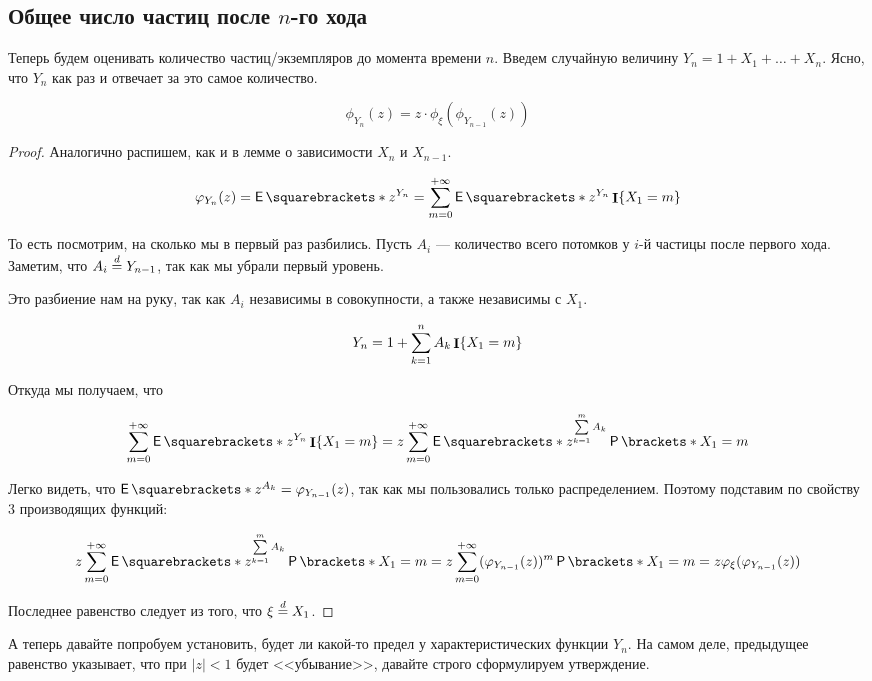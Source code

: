 \subsection{Общее число частиц после $n$-го хода}

Теперь будем оценивать количество частиц/экземпляров до момента времени $n$.
Введем случайную величину $Y_n = 1 + X_1 + \ldots + X_n$. Ясно, что $Y_n$
как раз и отвечает за это самое количество.

\begin{lemma}[О зависимости $Y_n$ и $Y_{n - 1}$]
  \[
    \phi_{Y_n}(z) = z\cdot\phi_{\xi}(\phi_{Y_{n - 1}}(z))
  \]
\end{lemma}

\begin{proof}
  Аналогично распишем, как и в лемме о зависимости $X_n$ и $X_{n - 1}$.

  \[
    \phi_{Y_n}(z) = \E{z^{Y_n}} = \sum\limits_{m = 0}^{+\infty} \E{z^{Y_n}
    \I\{X_1 = m\}}
  \]

  То есть посмотрим, на сколько мы в первый раз разбились. Пусть $A_i$ --- 
  количество всего потомков у $i$-й частицы после первого
  хода. Заметим, что $A_i \overset{d}{=} Y_{n - 1}$, так как мы убрали первый уровень.

  Это разбиение нам на руку, так как $A_i$ независимы в совокупности, а также
  независимы с $X_1$.

  \[
    Y_n = 1 + \sum\limits_{k = 1}^n A_k\mathop{\mathbf{I}}\{X_1 = m\}
  \]

  Откуда мы получаем, что

  \[
    \sum\limits_{m = 0}^{+\infty} \E{z^{Y_n}
    \I\{X_1 = m\}} = z\sum\limits_{m = 0}^{+\infty} \E{z^{\sum\limits_{k = 1}^m
    A_k}} \Pr{X_1 = m}
  \]

  Легко видеть, что $\E{z^{A_k}} = \phi_{Y_{n - 1}}(z)$, так как мы пользовались
  только
  распределением. Поэтому подставим по свойству 3 производящих функций:

  \[
    z\sum\limits_{m = 0}^{+\infty} \E{z^{\sum\limits_{k = 1}^m
    A_k}} \Pr{X_1 = m} = z\sum\limits_{m = 0}^{+\infty} 
    (\phi_{Y_{n - 1}}(z))^m\Pr{X_1 = m} = z\phi_{\xi}(\phi_{Y_{n - 1}}(z))
  \]

  Последнее равенство следует из того, что $\xi \overset{d}{=} X_1$.
\end{proof}

А теперь давайте попробуем установить, будет ли какой-то предел у характеристических
функции $Y_n$. На самом деле, предыдущее равенство указывает, что при $|z| < 1$
будет <<убывание>>, давайте строго сформулируем утверждение.

